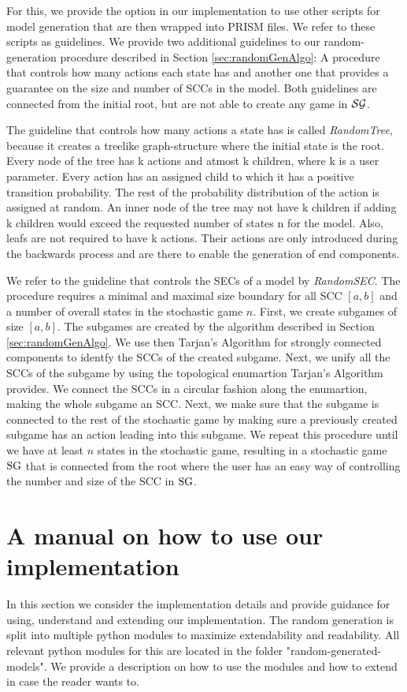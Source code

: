 For this, we provide the option in our implementation to use other scripts for model generation that are then wrapped into PRISM files. We refer to these scripts as guidelines.
We provide two additional guidelines to our random-generation procedure described in Section \ref{sec:randomGenAlgo}: 
A procedure that controls how many actions each state has and another one that provides a guarantee on the size and number of SCCs in the model.
Both guidelines are connected from the initial root, but are not able to create any game in $\mathcal{SG}$.

The guideline that controls how many actions a state has is called \emph{RandomTree}, 
because it creates a treelike graph-structure where the initial state is the root.
Every node of the tree has k actions and atmost k children, where k is a user parameter. 
Every action has an assigned child to which it has a positive transition probability.
The rest of the probability distribution of the action is assigned at random.
An inner node of the tree may not have k children if adding k children would exceed the requested number of states n for the model.
Also, leafs are not required to have k actions.
Their actions are only introduced during the backwards process and are there to enable the generation of end components.

We refer to the guideline that controls the SECs of a model by \emph{RandomSEC}.
The procedure requires a minimal and maximal size boundary for all SCC $[a, b]$ and a number of overall states in the stochastic game $n$.
First, we create subgames of size $[a,b]$.
The subgames are created by the algorithm described in Section \ref{sec:randomGenAlgo}.
We use then Tarjan's Algorithm for strongly connected components to identfy the SCCs of the created subgame.
Next, we unify all the SCCs of the subgame by using the topological enumartion Tarjan's Algorithm provides.
We connect the SCCs in a circular fashion along the enumartion, making the whole subgame an SCC.
Next, we make sure that the subgame is connected to the rest of the stochastic game by making sure a previously created subgame has an action
leading into this subgame. We repeat this procedure until we have at least $n$ states in the stochastic game, 
resulting in a stochastic game $\textrm{SG}$ that is connected from the root where the user has an easy way of controlling the number and size of the SCC in $\textrm{SG}$.

\section{A manual on how to use our implementation}
In this section we consider the implementation details and provide guidance for using, understand and extending our implementation.
The random generation is split into multiple python modules to maximize extendability and readability.
All relevant python modules for this are located in the folder "random-generated-models".
We provide a description on how to use the modules and how to extend in case the reader wants to.

